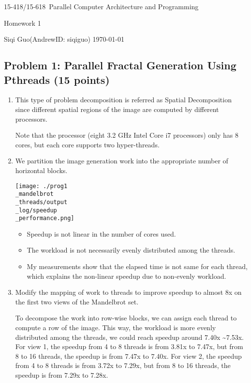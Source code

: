 \documentclass[letterpaper,11pt]{exam}
\newcommand{\num}{1}
\newcommand{\topic}{Homework \num}
\newcommand{\coursenum}{15-418/15-618}
\newcommand{\coursename}{\coursenum\ Parallel Computer Architecture and Programming}
\newcommand{\fullname}{Siqi Guo}
\newcommand{\andrew}{AndrewID: siqiguo}
\begin{document}
\begin{center}
    {\LARGE\coursename\par}
    {\Large\topic\par}
    \fullname (\andrew) \hfill \today
\end{center}
\printanswers


\begin{questions}
    \question
    \subsection*{Problem 1: Parallel Fractal Generation Using Pthreads (15 points)}

    \begin{enumerate}[label=\roman*.]
        \item This type of problem decomposition is referred as Spatial Decomposition since different spatial regions of the image are computed by different processors.

              Note that the processor (eight 3.2 GHz Intel Core i7 processors) only has 8 cores, but each core supports two hyper-threads.
        \item We partition the image generation work into the appropriate number of horizontal blocks.

              \texttt{[image: ./prog1\\\_mandelbrot\\\_threads/output\\\_log/speedup\\\_performance.png]}
              \begin{itemize}[label=$\circ$]
                  \item Speedup is not linear in the number of cores used.
                  \item The workload is not necessarily evenly distributed among the threads.
                  \item My measurements show that the elapsed time is not same for each thread, which explains the non-linear speedup due to non-evenly workload.
              \end{itemize}

              \vspace{0.3cm}

        \item Modify the mapping of work to threads to improve speedup to almost 8x on the first two
              views of the Mandelbrot set.

              To decompose the work into row-wise blocks, we can assign each thread to compute a row of the image.
              This way, the workload is more evenly distributed among the threads, we could reach speedup around 7.40x \textasciitilde 7.53x.
              For view 1, the speedup from 4 to 8 threads is from 3.81x to 7.47x, but from 8 to 16 threads, the speedup is from 7.47x to 7.40x.
              For view 2, the speedup from 4 to 8 threads is from 3.72x to 7.29x, but from 8 to 16 threads, the speedup is from 7.29x to 7.28x.


\end{enumerate}
\end{questions}
\end{document}
